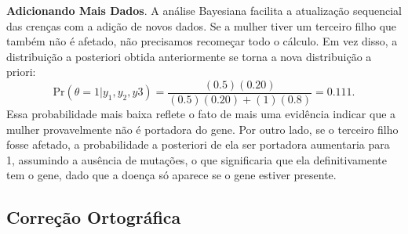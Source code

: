 \textbf{Adicionando Mais Dados}. A análise Bayesiana facilita a atualização sequencial das crenças com a adição de novos dados. Se a mulher tiver um terceiro filho que também não é afetado, não precisamos recomeçar todo o cálculo. Em vez disso, a distribuição a posteriori obtida anteriormente se torna a nova distribuição a priori:
\begin{equation*}
\text{Pr}(\theta = 1|y_1, y_2, y3) = \frac{(0.5)(0.20)}{(0.5)(0.20) + (1)(0.8)} = 0.111.
\end{equation*}
Essa probabilidade mais baixa reflete o fato de mais uma evidência indicar que a mulher provavelmente não é portadora do gene. Por outro lado, se o terceiro filho fosse afetado, a probabilidade a posteriori de ela ser portadora aumentaria para 1, assumindo a ausência de mutações, o que significaria que ela definitivamente tem o gene, dado que a doença só aparece se o gene estiver presente.

\subsection{Correção Ortográfica}